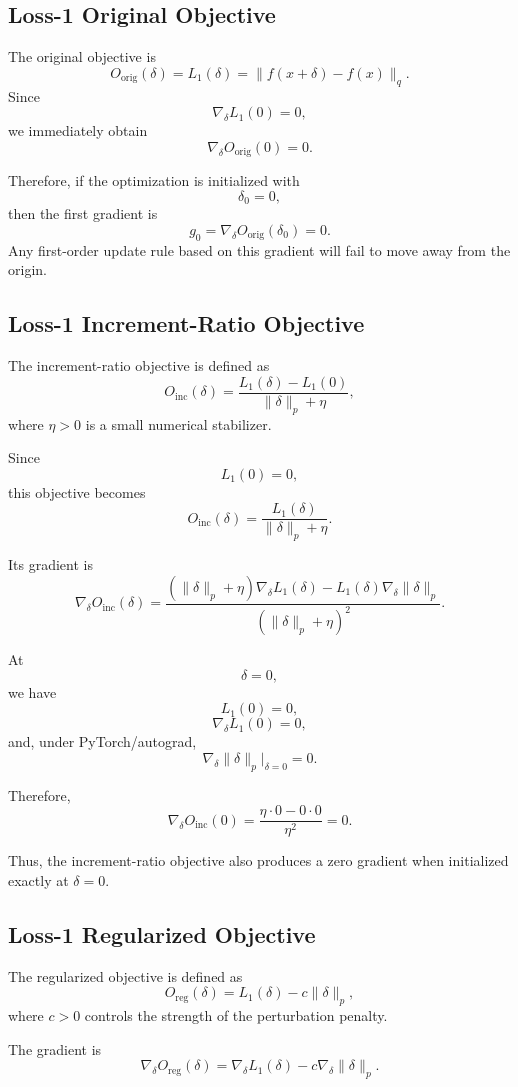\documentclass{article}
\begin{document}
\subsection{Loss-1 Original Objective}

The original objective is
\[
O_{\mathrm{orig}}(\delta)
=
L_1(\delta)
=
\|f(x+\delta)-f(x)\|_q.
\]
Since
\[
\nabla_\delta L_1(0)=0,
\]
we immediately obtain
\[
\nabla_\delta O_{\mathrm{orig}}(0)=0.
\]

Therefore, if the optimization is initialized with
\[
\delta_0=0,
\]
then the first gradient is
\[
g_0=\nabla_\delta O_{\mathrm{orig}}(\delta_0)=0.
\]
Any first-order update rule based on this gradient will fail to move away from the origin.

\subsection{Loss-1 Increment-Ratio Objective}

The increment-ratio objective is defined as
\[
O_{\mathrm{inc}}(\delta)
=
\frac{
L_1(\delta)-L_1(0)
}{
\|\delta\|_p+\eta
},
\]
where \(\eta>0\) is a small numerical stabilizer.

Since
\[
L_1(0)=0,
\]
this objective becomes
\[
O_{\mathrm{inc}}(\delta)
=
\frac{
L_1(\delta)
}{
\|\delta\|_p+\eta
}.
\]

Its gradient is
\[
\nabla_\delta O_{\mathrm{inc}}(\delta)
=
\frac{
(\|\delta\|_p+\eta)\nabla_\delta L_1(\delta)
-
L_1(\delta)\nabla_\delta \|\delta\|_p
}{
(\|\delta\|_p+\eta)^2
}.
\]

At
\[
\delta=0,
\]
we have
\[
L_1(0)=0,
\]
\[
\nabla_\delta L_1(0)=0,
\]
and, under PyTorch/autograd,
\[
\nabla_\delta \|\delta\|_p\big|_{\delta=0}=0.
\]

Therefore,
\[
\nabla_\delta O_{\mathrm{inc}}(0)
=
\frac{
\eta\cdot 0 - 0\cdot 0
}{
\eta^2
}
=
0.
\]

Thus, the increment-ratio objective also produces a zero gradient when initialized exactly at \(\delta=0\).

\subsection{Loss-1 Regularized Objective}

The regularized objective is defined as
\[
O_{\mathrm{reg}}(\delta)
=
L_1(\delta)-c\|\delta\|_p,
\]
where \(c>0\) controls the strength of the perturbation penalty.

The gradient is
\[
\nabla_\delta O_{\mathrm{reg}}(\delta)
=
\nabla_\delta L_1(\delta)
-
c\nabla_\delta \|\delta\|_p.
\]
\end{document}
